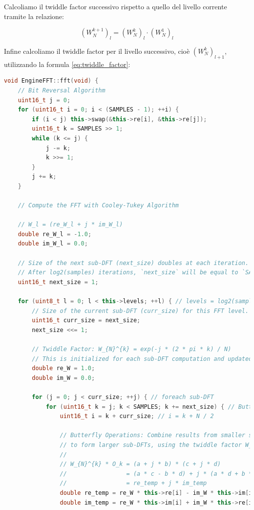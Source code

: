 \documentclass[a4paper,12pt]{report}  %
\begin{document}
Calcoliamo il twiddle factor successivo rispetto a quello del livello corrente tramite la relazione:

\begin{equation}
    \left ( W_N^{k + 1} \right )_l = \left ( W_N^{k} \right )_l \cdot \left ( W_N^1 \right )_l \nonumber
\end{equation}

Infine calcoliamo il twiddle factor per il livello successivo, cioè $\left ( W_N^{k} \right )_{l + 1}$, utilizzando la formula \eqref{eq:twiddle_factor}:

\begin{lstlisting}[language=C++, keywords={void, sqrt, uint16_t, while, for, if, double, this, uint8_t}]
void EngineFFT::fft(void) {
    // Bit Reversal Algorithm
    uint16_t j = 0;
    for (uint16_t i = 0; i < (SAMPLES - 1); ++i) {
        if (i < j) this->swap(&this->re[i], &this->re[j]);
        uint16_t k = SAMPLES >> 1;
        while (k <= j) {
            j -= k;
            k >>= 1;
        }
        j += k;
    }
    
    // Compute the FFT with Cooley-Tukey Algorithm
    
    // W_l = (re_W_l + j * im_W_l)
    double re_W_l = -1.0;
    double im_W_l = 0.0;
    
    // Size of the next sub-DFT (next_size) doubles at each iteration.
    // After log2(samples) iterations, `next_size` will be equal to `SAMPLES`.
    uint16_t next_size = 1;
    
    for (uint8_t l = 0; l < this->levels; ++l) { // levels = log2(samples)
        // Size of the current sub-DFT (curr_size) for this FFT level.
        uint16_t curr_size = next_size;
        next_size <<= 1;
    
        // Twiddle Factor: W_{N}^{k} = exp(-j * (2 * pi * k) / N)
        // This is initialized for each sub-DFT computation and updated iteratively.
        double re_W = 1.0;
        double im_W = 0.0;
    
        for (j = 0; j < curr_size; ++j) { // foreach sub-DFT
            for (uint16_t k = j; k < SAMPLES; k += next_size) { // Butterfly Operations
                uint16_t i = k + curr_size; // i = k + N / 2
        
                // Butterfly Operations: Combine results from smaller sub-DFTs
                // to form larger sub-DFTs, using the twiddle factor W_{N}^{k}.
                //
                // W_{N}^{k} * O_k = (a + j * b) * (c + j * d)
                //                 = (a * c - b * d) + j * (a * d + b * c)
                //                 = re_temp + j * im_temp
                double re_temp = re_W * this->re[i] - im_W * this->im[i];
                double im_temp = re_W * this->im[i] + im_W * this->re[i];
                

\end{lstlisting}
\end{document}
